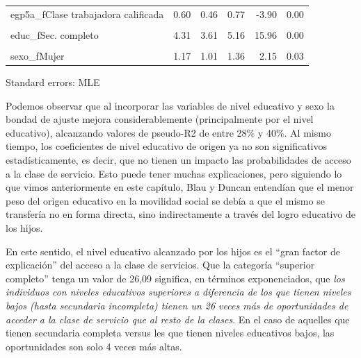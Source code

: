 \documentclass[
]{book}
\begin{document}
\begin{table}[!h]
\begin{threeparttable}
\begin{tabular}{lrrrrr}
egp5a\_fClase trabajadora calificada & 0.60 & 0.46 & 0.77 & -3.90 & 0.00\\
\cellcolor{gray!6}{egp5a\_fClase trabajadora no calificada} & \cellcolor{gray!6}{0.42} & \cellcolor{gray!6}{0.33} & \cellcolor{gray!6}{0.54} & \cellcolor{gray!6}{-7.02} & \cellcolor{gray!6}{0.00}\\
educ\_fSec. completo & 4.31 & 3.61 & 5.16 & 15.96 & 0.00\\
\cellcolor{gray!6}{educ\_fSuperior completo} & \cellcolor{gray!6}{26.09} & \cellcolor{gray!6}{21.24} & \cellcolor{gray!6}{32.04} & \cellcolor{gray!6}{31.10} & \cellcolor{gray!6}{0.00}\\
sexo\_fMujer & 1.17 & 1.01 & 1.36 & 2.15 & 0.03\\
\bottomrule
\end{tabular}
\begin{tablenotes}
\item Standard errors: MLE
\end{tablenotes}
\end{threeparttable}
\end{table}

Podemos observar que al incorporar las variables de nivel educativo y sexo la bondad de ajuste mejora considerablemente (principalmente por el nivel educativo), alcanzando valores de pseudo-R2 de entre 28\% y 40\%. Al mismo tiempo, los coeficientes de nivel educativo de origen ya no son significativos estadísticamente, es decir, que no tienen un impacto las probabilidades de acceso a la clase de servicio. Esto puede tener muchas explicaciones, pero siguiendo lo que vimos anteriormente en este capítulo, Blau y Duncan \citeyearpar{Blau.Duncan1967} entendían que el menor peso del origen educativo en la movilidad social se debía a que el mismo se transfería no en forma directa, sino indirectamente a través del logro educativo de los hijos.

En este sentido, el nivel educativo alcanzado por los hijos es el ``gran factor de explicación'' del acceso a la clase de servicios. Que la categoría ``superior completo'' tenga un valor de 26,09 significa, en términos exponenciados, que \emph{los individuos con niveles educativos superiores a diferencia de los que tienen niveles bajos (hasta secundaria incompleta) tienen un 26 veces más de oportunidades de acceder a la clase de servicio que al resto de la clases}. En el caso de aquelles que tienen secundaria completa versus les que tienen niveles educativos bajos, las oportunidades son solo 4 veces más altas.
\end{document}
